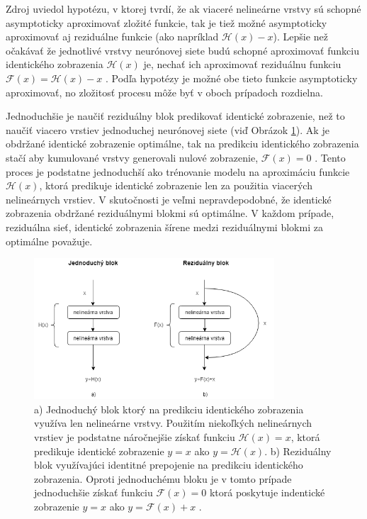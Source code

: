 Zdroj \cite{Wu2017} uviedol hypotézu, v ktorej tvrdí, že ak viaceré nelineárne vrstvy sú schopné asymptoticky aproximovať zložité funkcie, tak je tiež možné asymptoticky aproximovať aj reziduálne funkcie (ako napríklad $\mathcal{H}(x) - x$). Lepšie než očakávať že jednotlivé vrstvy neurónovej siete budú schopné aproximovať funkciu identického zobrazenia $\mathcal{H}(x)$ je, nechať ich aproximovať reziduálnu funkciu $\mathcal{F}(x) = \mathcal{H}(x) - x$ \cite{Wu2017}. Podľa hypotézy je možné obe tieto funkcie asymptoticky aproximovať, no zložitosť procesu môže byť v oboch prípadoch rozdielna.

Jednoduchšie je naučiť reziduálny blok predikovať identické zobrazenie, než to naučiť viacero vrstiev jednoduchej neurónovej siete (viď Obrázok \ref{fig:plainNetVsResNet}). Ak je obdržané identické zobrazenie optimálne, tak na predikciu identického zobrazenia stačí aby kumulované vrstvy generovali nulové zobrazenie, $\mathcal{F}(x)=0$ \cite{Wu2017}. Tento proces je podstatne jednoduchší ako trénovanie modelu na aproximáciu funkcie $\mathcal{H}(x)$, ktorá predikuje identické zobrazenie len za použitia viacerých nelineárnych vrstiev. V skutočnosti je veľmi nepravdepodobné, že identické zobrazenia obdržané reziduálnymi blokmi sú optimálne. V každom prípade, reziduálna sieť, identické zobrazenia šírene medzi reziduálnymi blokmi za optimálne považuje.

\begin{figure}

\centerline{\includegraphics[width=0.8\textwidth]{images/plainNetVsResNet}}
\caption[Porovnanie jednoduhcého a reziduálneho bloku]{a) Jednoduchý blok ktorý na predikciu identického zobrazenia využíva len nelineárne vrstvy. Použitím niekoľkých nelineárnych vrstiev je podstatne náročnejšie získať funkciu $\mathcal{H}(x)=x$, ktorá predikuje identické zobrazenie $y=x$ ako $y=\mathcal{H}(x)$. b) Reziduálny blok využívajúci identitné prepojenie na predikciu identického zobrazenia. Oproti jednoduchému bloku je v tomto prípade jednoduchšie získať funkciu $\mathcal{F}(x)=0$ ktorá poskytuje indentické zobrazenie $y=x$ ako $y=\mathcal{F}(x)+x$ \cite{Wu2017}.}
\label{fig:plainNetVsResNet}
\end{figure}

